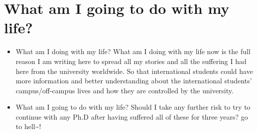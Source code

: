 \documentclass[9pt,b5paper]{article}
\begin{document}
\section{What am I going to do with my life?}
\label{sec-9}
\begin{itemize}
\item What am I doing with my life? What am I doing with my life now is the full reason I am writing here to spread all my stories and all the suffering I had here from the university worldwide. So that international students could have more information and better understanding about the international students' campus/off-campus lives and how they are controlled by the university.
\item What am I going to do with my life? Should I take any further risk to try to continue with any Ph.D after having suffered all of these for three years? go to hell\textasciitilde{}!
\end{itemize}
\end{document}
